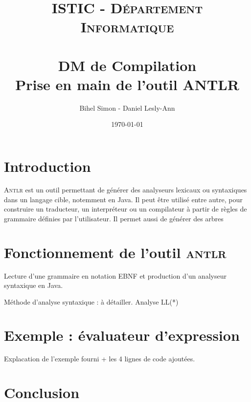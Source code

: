 \documentclass[paper=a4, fontsize=11pt]{scrartcl} %
\title{	
\normalfont \normalsize 
\textsc{ISTIC - Département Informatique} \\ [25pt]
\horrule{0.5pt} \\[0.4cm]
\huge DM de Compilation \\[0.2cm]
\Large Prise en main de l'outil ANTLR
\horrule{2pt} \\[0.5cm]
}
\author{Bihel Simon - Daniel Lesly-Ann}
\date{\normalsize\today}
\numberwithin{equation}{section} %
\numberwithin{figure}{section} %
\numberwithin{table}{section} %
\begin{document}
\maketitle


\section*{Introduction}
\textsc{Antlr} est un outil permettant de générer des analyseurs lexicaux ou syntaxiques dans un langage cible, notemment en Java. Il peut être utilisé entre autre, pour construire un traducteur, un interpréteur ou un compilateur à partir de règles de grammaire définies par l'utilisateur. Il permet aussi de générer des arbres 




\section{Fonctionnement de l'outil \textsc{antlr}}

Lecture d'une grammaire en notation EBNF et production d'un analyseur syntaxique en Java.

Méthode d'analyse syntaxique : à détailler. Analyse LL(*)



\section{Exemple : évaluateur d'expression}

Explacation de l'exemple fourni + les 4 lignes de code ajoutées.



\section*{Conclusion}

\end{document}
